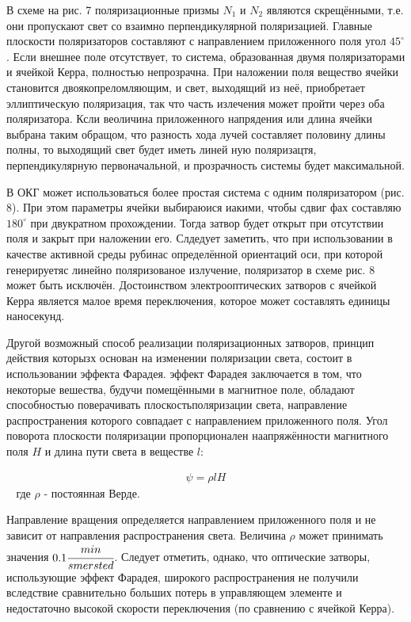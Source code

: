 \documentclass[a4paper,14pt,russian]{article}
\begin{document}
В схеме на рис. 7 поляризационные призмы $N_1$ и $N_2$ являются скрещёнными, т.е. они пропускают свет со взаимно перпендикулярной поляризацией. Главные плоскости поляризаторов составляют с направлением приложенного поля угол $45 ^\circ$. Если внешнее поле отсутствует, то система, образованная двумя поляризаторами и ячейкой Керра, полностью непрозрачна. При наложении поля вещество ячейки становится двоякопреломляющим, и свет, выходящий из неё, приобретает эллиптическую поляризация, так что часть излечения может пройти через оба поляризатора. Ксли веоличина приложенного напрядения или длина ячейки выбрана таким обращом, что разность хода лучей составляет половину длины полны, то выходящий свет будет иметь линей ную поляризацтя, перпендикулярную первоначальной, и прозрачность системы будет максимальной.

В ОКГ может использоваться более простая система с одним поляризатором (рис. 8). При этом параметры ячейки выбираюися иакими, чтобы сдвиг фах составляю $180 ^\circ$ при двукратном прохождении. Тогда затвор будет открыт при отсутствии поля и закрыт при наложении его. Слдедует заметить, что при использовании в качестве активной среды рубинас определённой ориентаций оси, при которой генерируетяс линейно поляризованое излучение, поляризатор в схеме рис. 8 может быть исключён. Достоинством электрооптических затворов с ячейкой Керра является малое время переключения, которое может составлять единицы наносекунд.

Другой возможный способ реализации поляризационных затворов, принцип действия которызх основан на изменении поляризации света, состоит в использовании эффекта Фарадея. эффект Фарадея заключается в том, что некоторые вешества, будучи помещёнными в магнитное поле, обладают способностью поверачивать плоскостьполяризации света, направление распространения которого совпадает с направлением приложенного поля. Угол поворота плоскости поляризации пропорционален наапряжённости магнитного поля $H$ и длина пути света в веществе $l$:


\begin{eqnarray}
\psi = \rho l H
\end{eqnarray}
$\;\;$ где $\rho$ - постоянная Верде.

Направление вращения определяется направлением приложенного поля и не зависит от направления распространения света. Величина $\rho$ может принимать значения $0.1 \cfrac {min} {sm ersted}$. Следует отметить, однако, что оптические затворы, использующие эффект Фарадея, широкого распространения не получили вследствие сравнительно больших потерь в управляющем элементе и недостаточно высокой скорости переключения (по сравнению с ячейкой Керра).
\end{document}
